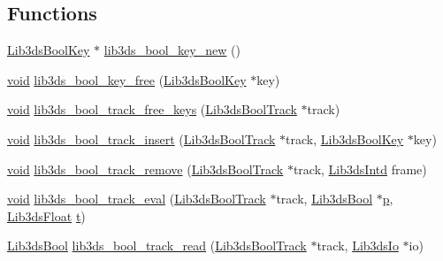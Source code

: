 \subsection*{Functions}
\begin{DoxyCompactItemize}
\item 
\hyperlink{struct_lib3ds_bool_key}{Lib3ds\-Bool\-Key} $\ast$ \hyperlink{group__tracks_gae3e2f2db59feb30601ac82c415c30549}{lib3ds\-\_\-bool\-\_\-key\-\_\-new} ()
\item 
\hyperlink{group___u_a_v_objects_plugin_ga444cf2ff3f0ecbe028adce838d373f5c}{void} \hyperlink{group__tracks_gab1a8ad6ed429a91e27afe57742f660d4}{lib3ds\-\_\-bool\-\_\-key\-\_\-free} (\hyperlink{struct_lib3ds_bool_key}{Lib3ds\-Bool\-Key} $\ast$key)
\item 
\hyperlink{group___u_a_v_objects_plugin_ga444cf2ff3f0ecbe028adce838d373f5c}{void} \hyperlink{group__tracks_gaa9930277963bb67cd92f4658fae2c7b3}{lib3ds\-\_\-bool\-\_\-track\-\_\-free\-\_\-keys} (\hyperlink{struct_lib3ds_bool_track}{Lib3ds\-Bool\-Track} $\ast$track)
\item 
\hyperlink{group___u_a_v_objects_plugin_ga444cf2ff3f0ecbe028adce838d373f5c}{void} \hyperlink{group__tracks_gaaaf325aca33983f7da7d49c22add0a89}{lib3ds\-\_\-bool\-\_\-track\-\_\-insert} (\hyperlink{struct_lib3ds_bool_track}{Lib3ds\-Bool\-Track} $\ast$track, \hyperlink{struct_lib3ds_bool_key}{Lib3ds\-Bool\-Key} $\ast$key)
\item 
\hyperlink{group___u_a_v_objects_plugin_ga444cf2ff3f0ecbe028adce838d373f5c}{void} \hyperlink{group__tracks_gab551dbe164827d7d228e45bf3598ece2}{lib3ds\-\_\-bool\-\_\-track\-\_\-remove} (\hyperlink{struct_lib3ds_bool_track}{Lib3ds\-Bool\-Track} $\ast$track, \hyperlink{types_8h_a5d92ad41149cf040ce2ee32cc2609403}{Lib3ds\-Intd} frame)
\item 
\hyperlink{group___u_a_v_objects_plugin_ga444cf2ff3f0ecbe028adce838d373f5c}{void} \hyperlink{group__tracks_ga451e7ae1b9a3a32736f8a9cbb42f5c2c}{lib3ds\-\_\-bool\-\_\-track\-\_\-eval} (\hyperlink{struct_lib3ds_bool_track}{Lib3ds\-Bool\-Track} $\ast$track, \hyperlink{types_8h_a89dd7398a9ebbbf28011f8c32df67ad3}{Lib3ds\-Bool} $\ast$\hyperlink{glext_8h_aa5367c14d90f462230c2611b81b41d23}{p}, \hyperlink{types_8h_ab18e70f51f9a53c9dee8d930c8e1a7bf}{Lib3ds\-Float} \hyperlink{glext_8h_a00140d6f5c548b26daf170bf16e86a6d}{t})
\item 
\hyperlink{types_8h_a89dd7398a9ebbbf28011f8c32df67ad3}{Lib3ds\-Bool} \hyperlink{group__tracks_gaf00e12217fdb1905e27d027a6d05a599}{lib3ds\-\_\-bool\-\_\-track\-\_\-read} (\hyperlink{struct_lib3ds_bool_track}{Lib3ds\-Bool\-Track} $\ast$track, \hyperlink{struct_lib3ds_io}{Lib3ds\-Io} $\ast$io)

\end{DoxyCompactItemize}
